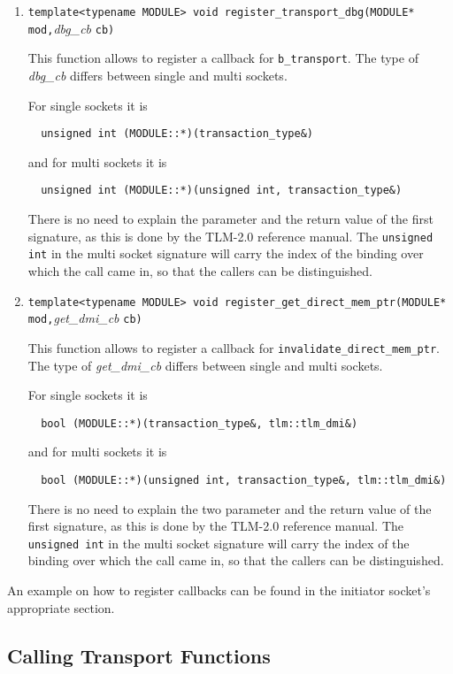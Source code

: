 \documentclass[a4paper,10pt]{article}          %
\begin{document}
\begin{enumerate}
\item 
\verb|template<typename MODULE> void register_transport_dbg(MODULE* mod,|\emph{dbg\_cb} \verb|cb)|

This function allows to register a callback for \verb|b_transport|. The type of \emph{dbg\_cb} differs between single and multi sockets.

For single sockets it is 

\verb|  unsigned int (MODULE::*)(transaction_type&)|

and for multi sockets it is

\verb|  unsigned int (MODULE::*)(unsigned int, transaction_type&)|

There is no need to explain the parameter and the return value of the first signature, as this is done by the TLM-2.0 reference manual. The \verb|unsigned int| in the multi socket signature will carry the index of the binding over which the call came in, so that the callers can be distinguished.


\item 
\verb|template<typename MODULE> void register_get_direct_mem_ptr(MODULE* mod,|\emph {get\_dmi\_cb} \verb|cb)|

This function allows to register a callback for \verb|invalidate_direct_mem_ptr|. The type of \emph{get\_dmi\_cb} differs between single and multi sockets.

For single sockets it is 

\verb|  bool (MODULE::*)(transaction_type&, tlm::tlm_dmi&)|

and for multi sockets it is

\verb|  bool (MODULE::*)(unsigned int, transaction_type&, tlm::tlm_dmi&)|

There is no need to explain the two parameter and the return value of the first signature, as this is done by the TLM-2.0 reference manual. The \verb|unsigned int| in the multi socket signature will carry the index of the binding over which the call came in, so that the callers can be distinguished.

\end{enumerate}

An example on how to register callbacks can be found in the initiator socket's appropriate section.

\subsection{Calling Transport Functions}
\end{document}
